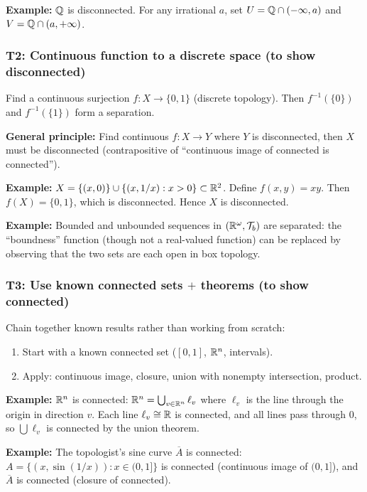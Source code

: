 \documentclass{article}
\begin{document}
\textbf{Example:} $\mathbb{Q}$ is disconnected. For any irrational $a$, set
$U = \mathbb{Q} \cap (-\infty, a)$ and $V = \mathbb{Q} \cap (a, +\infty)$.

\subsubsection*{T2: Continuous function to a discrete space (to show
disconnected)}
Find a continuous surjection $f : X \to \{0, 1\}$ (discrete topology).
Then $f^{-1}(\{0\})$ and $f^{-1}(\{1\})$ form a separation.

\textbf{General principle:} Find continuous $f : X \to Y$ where $Y$ is
disconnected, then $X$ must be disconnected (contrapositive of
``continuous image of connected is connected'').

\textbf{Example:} $X = \{(x,0)\} \cup \{(x,1/x) : x > 0\} \subset \mathbb{R}^2$.
Define $f(x,y) = xy$. Then $f(X) = \{0, 1\}$, which is disconnected.
Hence $X$ is disconnected.

\textbf{Example:} Bounded and unbounded sequences in $(\mathbb{R}^\omega,
\mathcal{T}_b)$ are separated: the ``boundness'' function (though not a
real-valued function) can be replaced by observing that the two sets are
each open in box topology.

\subsubsection*{T3: Use known connected sets $+$ theorems (to show connected)}
Chain together known results rather than working from scratch:
\begin{enumerate}
  \item Start with a known connected set ($[0,1]$, $\mathbb{R}^n$, intervals).
  \item Apply: continuous image, closure, union with nonempty intersection,
    product.
\end{enumerate}

\textbf{Example:} $\mathbb{R}^n$ is connected: $\mathbb{R}^n = \bigcup_{v \in \mathbb{R}^n}
\ell_v$ where $\ell_v$ is the line through the origin in direction $v$.
Each line $\ell_v \cong \mathbb{R}$ is connected, and all lines pass through $0$,
so $\bigcup \ell_v$ is connected by the union theorem.

\textbf{Example:} The topologist's sine curve $\overline A$ is connected:
$A = \{(x, \sin(1/x)) : x \in (0,1]\}$ is connected (continuous image of
$(0,1]$), and $\overline{A}$ is connected (closure of connected).
\end{document}
